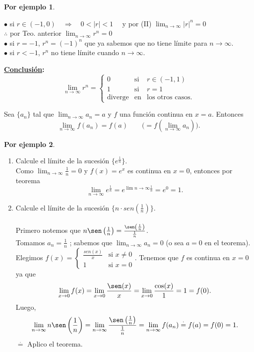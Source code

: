 \documentclass{article}
\theoremstyle{definition}
\theoremstyle{definition}
\newtheorem*{ej}{Por ejemplo}
\theoremstyle{remark}
\begin{document}
\begin{ej}
\begin{enumerate}
        $\bullet$ si $r \in (-1,0)\quad \Rightarrow \quad 0<|r|<1 \quad$ y por (II) $\lim_{n \to \infty}{|r|^n}=0$ \\ $\therefore$ por Teo. anterior $\lim_{n \to \infty}{r^n}=0$ \\
        $\bullet$ si $r = -1$, $r^n=(-1)^n$ que ya sabemos que no tiene límite para $n \to \infty$. \\
        $\bullet$ si $r< -1$, $r^n$ no tiene límite cuando $n \to \infty$. 
    \end{enumerate}
\textbf{\underline{Conclusión}:}
\[ 
  \lim_{n \to \infty}{r^n} = \left\{ 
    \begin{array}{lcl}
      0 & \text{si} & r \in (-1,1) \\
      1 &\text{si} & r=1 \\
      \text{diverge} & \text{en} & \text{los otros casos.}
    \end{array}
  \right.
\]
\end{ej}

\begin{teo}
  Sea $\{ a_n \}$ tal que $\lim_{n \to \infty }{a_n}=a$ y $f$ una función continua en $x=a$. Entonces \[ 
    \lim_{n \to \infty}{f(a_n)}=f(a) \quad \quad \big(=f(\lim_{n \to \infty}{a_n})\big).
  \]
\end{teo}
\begin{ej} \; \\
    \begin{enumerate}
      \item Calcule el límite de la sucesión $\{e^{\frac{1}{n}}\}$. \\
        Como $\lim_{n \to \infty}{\frac{1}{n}}=0$ y $f(x)=e^x$ es continua en $x=0$, entonces por teorema \[ 
          \lim_{n \to \infty}{e^{\frac{1}{n}}}=e^{\lim{n\to\infty}{\frac{1}{n}}}=e^0=1.
        \]
      \item  Calcule el límite de la sucesión $\{ n \cdot sen\left(\frac{1}{n}\right)\}$. \\\\
        Primero notemos que $n\sen\left(\frac{1}{n}\right)=\frac{\sen\left(\frac{1}{n}\right)}{\frac{1}{n}}$.\\
        Tomamos $a_n=\frac{1}{n}$ ; sabemos que $\lim_{n \to \infty}{a_n}=0$ (o sea $a=0$ en el teorema). \\
        Elegimos $ f(x)=\left\{ \begin{array}{cl}
            \frac{sen(x)}{x} & \text{si } x \neq 0 \\
            1                & \text{si } x=0
        \end{array}. \right. $ 
        Tenemos que $f$ es continua en $x=0$ ya que \[\lim_{x\to 0}{f(x)}=\lim_{x \to 0}{\frac{\sen(x)}{x}}=\lim_{x \to 0}{\frac{\cos(x)}{1}}=1=f(0).
        \]
      Luego, \[
      \lim_{n \to \infty}{n\sen\left(\frac{1}{n}\right)}=\lim_{n \to \infty}{\frac{\sen\left(\frac{1}{n}\right)}{\frac{1}{n}}}=\lim_{n \to \infty }{f(a_n)}\overset{\cdot}{=}f(a)=f(0)=1. \]
      $\overset{\cdot}{=}$ Aplico el teorema.

    \end{enumerate}
\end{ej}
\end{document}
